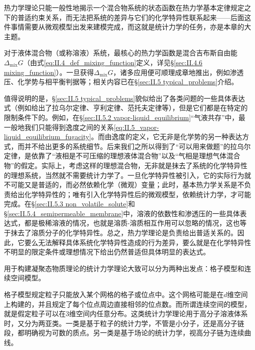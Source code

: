 \documentclass[main.tex]{subfiles}
\begin{document}
热力学理论只能一般性地揭示一个混合物系统的状态函数在热力学基本定律规定之下的普适约束关系，而无法把系统的差异与它们的化学特异性联系起来——后面这件事情需要从微观模型出发来建模完成，而这就是统计力学的任务，亦是本章的大主题。

对于液体混合物（或称溶液）系统，最核心的热力学函数是混合吉布斯自由能$\Delta_\text{mix} G$（由式\eqref{eq:II.4_def_mixing_function}定义，详见\S\ref{sec:II.4.6 mixing_function}）。一旦获得$\Delta_\text{mix} G$，诸多应用便可顺理成章地推出，例如渗透压、化学势与相平衡判据等；相关内容已在\S\ref{sec:II.5 typical_problems}介绍。

值得说明的是，\S\ref{sec:II.5 typical_problems}貌似给出了各类问题的一些具体表达式（例如给出了拉乌尔定律、亨利定律、范托夫定律等），但是它们都是在特定的限制条件下的。例如，在\S\ref{sec:II.5.2 vapor-liquid_equilibrium}“气液共存”中，最一般地我们只能得到逸度之间的关系\eqref{eq:II.5_vapor-liquid_equilibrium_fugacity}。而由逸度的定义，它无非是化学势的另一种表达方式，而并不给出更多的系统细节。后来我们之所以得到了“可以用来做题”的拉乌尔定律，是依靠了“液相是不可压缩的理想液体混合物”以及“气相是理想气体混合物”的假定。实际上，考虑这样的理想混合物，无非就是抹去了系统的化学特异性的理想系统，当然就不需要统计力学了。一旦化学特异性被引入，它的实际行为就不可能又是普适的，而必然依赖化学（微观）变量；此时，基本热力学关系是不负责给出化学特异性的；唯有引入化学特异性后的微观模型，依赖统计力学，才可能完成。在\S\ref{sec:II.5.3 non_volatile_solute}和\S\ref{sec:II.5.4_semipermeable_membrane}中，溶液的依数性和渗透压的一些具体表达式，都是极稀溶液的情况，也就是溶质-溶质相互作用可以忽略的情况，这也等于抹去了溶质分子的化学特异性。总之，热力学理论是负责给出普适关系的。因此，它要么无法解释具体系统化学特异性造成的行为差异，要么就是在化学特异性不明显的限定条件或理想情况下给出仍然普适但具体明显的表达式。

用于构建凝聚态物质理论的统计力学理论大致可以分为两种出发点：格子模型和连续空间模型。

格子模型规定粒子只能放入某个网格的格子或位点中。这个网格可能是在$d$维空间上构建的，并且规定了每个位点周边直接相邻的位点数。而所谓连续空间的模型，就是假定粒子可以在3维空间内任意分布。这类统计力学理论用于高分子溶液体系时，又分为两亚类。一类是基于粒子的统计力学，不管是小分子，还是高分子链段，都明确视为可数的质点。另一类是基于场论的统计力学，视高分子链为连续曲线。
\end{document}
